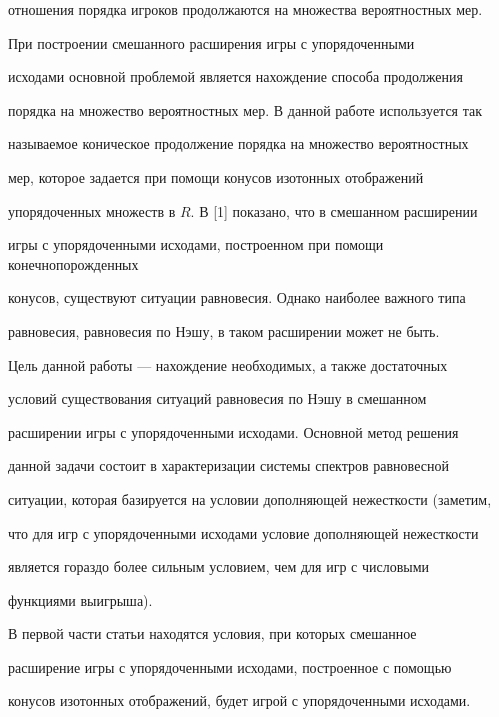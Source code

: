 отношения порядка игроков продолжаются на множества вероятностных мер. 


 


При построении смешанного расширения игры с упорядоченными 


исходами основной проблемой является нахождение способа продолжения 


порядка на множество вероятностных мер. В данной работе используется так 


называемое коническое продолжение порядка на множество вероятностных 


мер, которое задается при помощи конусов изотонных отображений 


упорядоченных множеств в $R$. В [1] показано, что в смешанном расширении 


игры с упорядоченными исходами, построенном при помощи конечнопорожденных 


конусов, существуют ситуации равновесия. Однако наиболее важного типа 


равновесия, равновесия по Нэшу, в таком расширении может не быть. 


 


Цель данной работы --- нахождение необходимых, а также достаточных 


условий существования ситуаций равновесия по Нэшу в смешанном 


расширении игры с упорядоченными исходами. Основной метод решения 


данной задачи состоит в характеризации системы спектров равновесной 


ситуации, которая базируется на условии дополняющей нежесткости (заметим, 


что для игр с упорядоченными исходами условие дополняющей нежесткости 


является гораздо более сильным условием, чем для игр с числовыми 


функциями выигрыша). 


 


В первой части статьи находятся условия, при которых смешанное 


расширение игры с упорядоченными исходами, построенное с помощью 


конусов изотонных отображений, будет игрой с упорядоченными исходами. 


 


